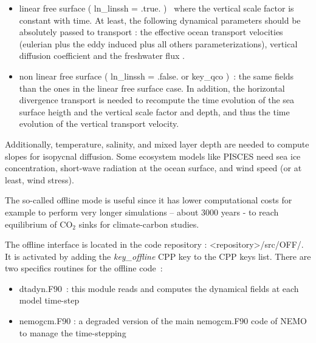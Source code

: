 \documentclass[../main/TOP_manual]{subfiles}
\begin{document}
\begin{itemize}
	\item linear free surface ( ln\_linssh = .true. )  where the vertical scale factor is constant with time. At least, the following dynamical parameters should be absolutely passed
	to transport : the effective ocean transport velocities (eulerian plus the eddy induced plus all others parameterizations), vertical diffusion coefficient and the freshwater flux
.
	\item non linear free surface ( ln\_linssh = .false. or key\_qco ) : the same fields than the ones in the linear free surface case. In addition, the horizontal divergence transport is needed to  recompute the time evolution of the sea surface heigth and the vertical scale factor and depth, and thus the time evolution of the vertical transport velocity.
\end{itemize}

Additionally, temperature, salinity, and mixed layer depth are needed to compute slopes for isopycnal diffusion. Some ecosystem models like PISCES need sea ice concentration, short-wave radiation at the ocean surface, and wind speed (or at least, wind stress). 

The so-called offline mode is useful since it has lower computational costs for example to perform very longer simulations – about 3000 years - to reach equilibrium of CO$_{2}$ sinks for climate-carbon studies.

The offline interface is located in the code repository : <repository>/src/OFF/. It is activated by adding the\textit{ key\_offline} CPP key to the CPP keys list. 
There are
two specifics routines for the offline code :
\begin{itemize}
	\item dtadyn.F90 : this module reads and computes the dynamical fields at
each model time-step
	\item nemogcm.F90 : a degraded version of the main nemogcm.F90 code of NEMO to
manage the time-stepping
\end{itemize}
\end{document}
